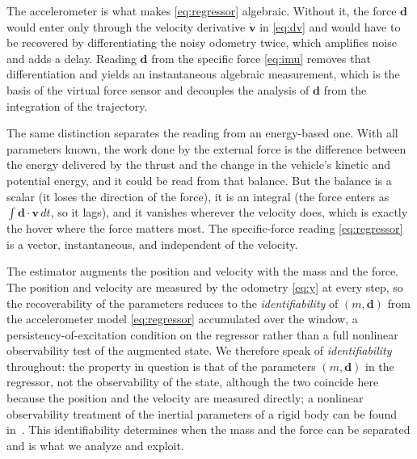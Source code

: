 \documentclass{ieeeaccess}
\newcommand{\vect}[1]{\bm{#1}}
\begin{document}
The accelerometer is what makes \eqref{eq:regressor} algebraic. Without it, the
force $\vect{d}$ would enter only through the velocity derivative
$\dot{\vect{v}}$ in \eqref{eq:dv} and would have to be recovered by
differentiating the noisy odometry twice, which amplifies noise and adds a
delay. Reading $\vect{d}$ from the specific force \eqref{eq:imu} removes that
differentiation and yields an instantaneous algebraic measurement, which is the
basis of the virtual force sensor and decouples the analysis of $\vect{d}$ from
the integration of the trajectory.

The same distinction separates the reading from an energy-based one. With all
parameters known, the work done by the external force is the difference between
the energy delivered by the thrust and the change in the vehicle's kinetic and
potential energy, and it could be read from that balance. But the balance is a
scalar (it loses the direction of the force), it is an integral (the force enters
as $\int\vect{d}\cdot\vect{v}\,dt$, so it lags), and it vanishes wherever the
velocity does, which is exactly the hover where the force matters most. The
specific-force reading \eqref{eq:regressor} is a vector, instantaneous, and
independent of the velocity.

The estimator augments the position and velocity with the mass and the force.
The position and velocity are measured by the odometry \eqref{eq:y} at every step,
so the recoverability of the parameters reduces to the \emph{identifiability} of
$(m,\vect{d})$ from the accelerometer model \eqref{eq:regressor} accumulated over
the window, a persistency-of-excitation condition on the regressor rather than a
full nonlinear observability test of the augmented state. We therefore speak of
\emph{identifiability} throughout: the property in question is that of the
parameters $(m,\vect{d})$ in the regressor, not the observability of the state,
although the two coincide here because the position and the velocity are
measured directly; a nonlinear observability treatment of the inertial
parameters of a rigid body can be found in~\cite{boyacioglu2023inertial}. This
identifiability determines when the mass and the force can be separated and is
what we analyze and exploit.
\end{document}
